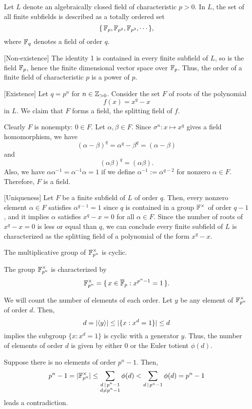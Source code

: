 \documentclass{../exp}
\begin{document}
\begin{thm}
Let $L$ denote an algebraically closed field of characteristic $p>0$.
In $L$, the set of all finite subfields is described as a totally ordered set
\[\{\,\mathbb{F}_p,\mathbb{F}_{p^2},\mathbb{F}_{p^3},\cdots\,\},\]
where $\mathbb{F}_q$ denotes a field of order $q$.
\end{thm}
\begin{pf}
[Non-existence]
The identity 1 is contained in every finite subfield of $L$, so is the field $\mathbb{F}_p$, hence the finite dimensional vector space over $\mathbb{F}_p$.
Thus, the order of a finite field of characteristic $p$ is a power of $p$.

[Existence]
Let $q=p^n$ for $n\in\mathbb{Z}_{>0}$.
Consider the set $F$ of roots of the polynomial
\[f(x)=x^q-x\]
in $L$.
We claim that $F$ forms a field, the splitting field of $f$.

Clearly $F$ is nonempty: $0\in F$.
Let $\alpha,\beta\in F$.
Since $\sigma^n:x\mapsto x^q$ gives a field homomorphism, we have
\[(\alpha-\beta)^q=\alpha^q-\beta^q=(\alpha-\beta)\]
and
\[(\alpha\beta)^q=(\alpha\beta).\]
Also, we have $\alpha\alpha^{-1}=\alpha^{-1}\alpha=1$ if we define $\alpha^{-1}:=\alpha^{q-2}$ for nonzero $\alpha\in F$.
Therefore, $F$ is a field.

[Uniqueness]
Let $F$ be a finite subfield of $L$ of order $q$.
Then, every nonzero element $\alpha\in F$ satisfies $\alpha^{q-1}=1$ since $q$ is contained in a group $\mathbb{F}^\times$ of order $q-1$, and it implies $\alpha$ satisfies $x^q-x=0$ for all $\alpha\in F$.
Since the number of roots of $x^q-x=0$ is less or equal than $q$, we can conclude every finite subfield of $L$ is characterized as the splitting field of a polynomial of the form $x^q-x$.
\end{pf}

\begin{thm}
The multiplicative group of $\mathbb{F}_{p^n}^\times$ is cyclic.
\end{thm}
\begin{pf}
The group $\mathbb{F}_{p^n}^\times$ is characterized by
\[\mathbb{F}_{p^n}^\times=\{\,x\in\overline{\mathbb{F}}_p:x^{p^n-1}=1\,\}.\]

We will count the number of elements of each order.
Let $y$ be any element of $\mathbb{F}_{p^n}^\times$ of order $d$.
Then,
\[d=|\langle y\rangle|\le|\{x:x^d=1\}|\le d\]
implies the subgroup $\{x:x^d=1\}$ is cyclic with a generator $y$.
Thus, the number of elements of order $d$ is given by either 0 or the Euler totient $\phi(d)$.

Suppose there is no elements of order $p^n-1$.
Then,
\[p^n-1=|\mathbb{F}_{p^n}^\times|\le\sum_{\substack{d\,\mid\,p^n-1\\d\ne p^n-1}}\phi(d)<\sum_{d\,\mid\,p^n-1}\phi(d)=p^n-1\]
leads a contradiction.
\end{pf}
\end{document}
